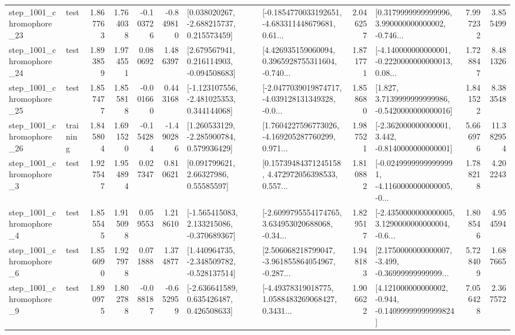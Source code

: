 \begin{tabular}{llrrrrllrlrr}
 step\_1001\_chromophore\_23 &      test &      1.867763 &    1.764038 &     -0.103726 & -0.849810 &    [0.038020267, -2.688215737, 0.215573459] &  [-0.1854770033192651, -4.683311448679681, 0.61... &       2.046257 &  [0.3179999999999996, 3.990000000000002, -0.746... &            7.997232 &          3.855499 \\
 step\_1001\_chromophore\_24 &      test &      1.893859 &    1.974551 &      0.080692 &  1.486397 &    [2.679567941, 0.216114903, -0.094508683] &  [4.426935159060094, 0.3965928755311604, -0.740... &       1.871771 &  [-4.140000000000001, -0.2220000000000013, 0.08... &            1.728847 &          8.481326 \\
 step\_1001\_chromophore\_25 &      test &      1.857477 &    1.855818 &     -0.001660 &  0.443168 &   [-1.123107556, -2.481025353, 0.344144068] &  [-2.0477039019874717, -4.039128131349328, -0.0... &       1.858680 &   [1.827, 3.7139999999999986, -0.5420000000000016] &            1.841522 &          8.383548 \\
 step\_1001\_chromophore\_26 &  training &      1.845804 &    1.691520 &     -0.154284 & -1.490286 &    [1.260533129, -2.285900784, 0.579936429] &  [1.7604227596773026, -4.169205287760299, 0.971... &       1.987521 &   [-2.362000000000001, 3.442, -0.8140000000000001] &            5.666976 &         11.382954 \\
  step\_1001\_chromophore\_3 &      test &      1.927547 &    1.954894 &      0.027347 &  0.810621 &       [0.091799621, 2.66327986, 0.55585597] &  [0.15739484371245158, 4.472972056398533, 0.557... &       1.810882 &  [-0.02499999999999991, -4.1160000000000005, -0... &            1.788218 &          4.202243 \\
  step\_1001\_chromophore\_4 &      test &      1.855545 &    1.915098 &      0.059553 &  1.218610 &   [-1.565415083, 2.133215086, -0.370689367] &  [-2.6099795554174765, 3.634953020688068, -0.34... &       1.829517 &  [-2.4350000000000005, 3.1290000000000004, -0.6... &            1.808546 &          4.954594 \\
  step\_1001\_chromophore\_6 &      test &      1.856090 &    1.927978 &      0.071888 &  1.374877 &   [1.440964735, -2.348509782, -0.528137514] &  [2.506068218799047, -3.961855864054967, -0.287... &       1.948183 &  [2.1750000000000007, -3.499, -0.36999999999999... &            5.728409 &          1.687665 \\
  step\_1001\_chromophore\_9 &      test &      1.890975 &    1.802788 &     -0.088187 & -0.652959 &    [-2.636641589, 0.635426487, 0.426508633] &  [-4.49378319018775, 1.0588483269068427, 0.3431... &       1.906622 &  [4.121000000000002, -0.944, -0.14099999999999824] &            7.056428 &          2.367572 \\

\end{tabular}
